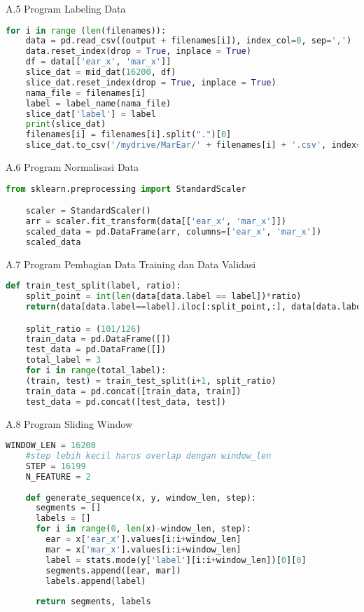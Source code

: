 A.5 Program Labeling Data
\begin{lstlisting}[language=Python]
    for i in range (len(filenames)):
    data = pd.read_csv((output + filenames[i]), index_col=0, sep=',')
    data.reset_index(drop = True, inplace = True)
    df = data[['ear_x', 'mar_x']]
    slice_dat = mid_dat(16200, df)
    slice_dat.reset_index(drop = True, inplace = True)
    nama_file = filenames[i]
    label = label_name(nama_file)
    slice_dat['label'] = label
    print(slice_dat)
    filenames[i] = filenames[i].split(".")[0]
    slice_dat.to_csv('/mydrive/MarEar/' + filenames[i] + '.csv', index=False)
\end{lstlisting}

\newpage
A.6 Program Normalisasi Data
\begin{lstlisting}[language=Python]
    from sklearn.preprocessing import StandardScaler

    scaler = StandardScaler()
    arr = scaler.fit_transform(data[['ear_x', 'mar_x']])
    scaled_data = pd.DataFrame(arr, columns=['ear_x', 'mar_x'])
    scaled_data
\end{lstlisting}

A.7 Program Pembagian Data Training dan Data Validasi
\begin{lstlisting}[language=Python]
    def train_test_split(label, ratio):
    split_point = int(len(data[data.label == label])*ratio)
    return(data[data.label==label].iloc[:split_point,:], data[data.label==label].iloc[split_point:, :])

    split_ratio = (101/126)
    train_data = pd.DataFrame([])
    test_data = pd.DataFrame([])
    total_label = 3
    for i in range(total_label):
    (train, test) = train_test_split(i+1, split_ratio)
    train_data = pd.concat([train_data, train])
    test_data = pd.concat([test_data, test])
\end{lstlisting}

A.8 Program Sliding Window
\begin{lstlisting}[language=Python]
    WINDOW_LEN = 16200
    #step lebih kecil harus overlap dengan window_len
    STEP = 16199
    N_FEATURE = 2
    
    def generate_sequence(x, y, window_len, step):
      segments = []
      labels = []
      for i in range(0, len(x)-window_len, step):
        ear = x['ear_x'].values[i:i+window_len]
        mar = x['mar_x'].values[i:i+window_len]
        label = stats.mode(y['label'][i:i+window_len])[0][0]
        segments.append([ear, mar])
        labels.append(label)
    
      return segments, labels
\end{lstlisting}

